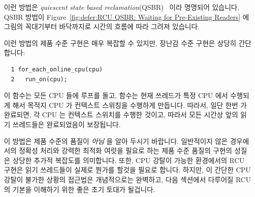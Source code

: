 이런 방법은 \emph{quiescent state based
reclamation}(QSBR)~\cite{ThomasEHart2006a} 이라 명명되어 있습니다.
QSBR 방법이
Figure~\ref{fig:defer:RCU QSBR: Waiting for Pre-Existing Readers}
에 그림의 꼭대기부터
바닥까지로 시간의 흐름에 따라 그려져 있습니다.

이런 방법의 제품 수준 구현은 매우 복잡할 수 있지만, 장난감 수준 구현은 상당히
간단합니다:

\vspace{5pt}
\begin{minipage}[t]{\columnwidth}
\scriptsize
\begin{verbatim}
  1 for_each_online_cpu(cpu)
  2   run_on(cpu);
\end{verbatim}
\end{minipage}
\vspace{5pt}

이  함수는 모든 CPU 들에 루프를 돌고, 
함수는 현재 쓰레드가 특정 CPU 에서 수행되게 해서 목적지 CPU 가 컨텍스트
스위칭을 수행하게 만듭니다.
따라서, 일단 한번  가 완료되면, 각 CPU 는 컨텍스트
스위치를 수행한 것이고, 따라서 모든 시간상 앞의 읽기 쓰레드들은 완료되었음이
보장됩니다.

이 방법은 제품 수준의 품질이 \emph{아님} 을 알아 두시기 바랍니다.
일반적이지 않은 경우에서의 정확성 처리와 강력한 최적화 여럿을 필요로 하는 제품
수준 품질의 구현의 성질은 상당한 추가적 복잡도를 의미합니다.
또한, CPU 강탈이 가능한 환경에서의 RCU 구현은 읽기 쓰레드들이 실제로 뭔가를
할것을 필요로 합니다.
하지만, 이 간단한 CPU 강탈이 불가한 상황의 접근법은 개념적으로는 완벽하고, 다음
섹션에서 다루어질 RCU 의 기본을 이해하기 위한 좋은 초기 토대가 될겁니다.


